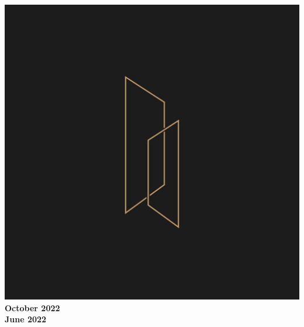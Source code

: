 \documentclass[10pt]{article}
\begin{document}
\begin{minipage}{0.2\textwidth}
\begin{center}
\includegraphics[width=\textwidth]{tt_coldcalling.jpg} \\
    \large\textbf{October 2022\\June 2022}
\end{center}
\end{minipage}

\vspace{3em}

\end{document}
